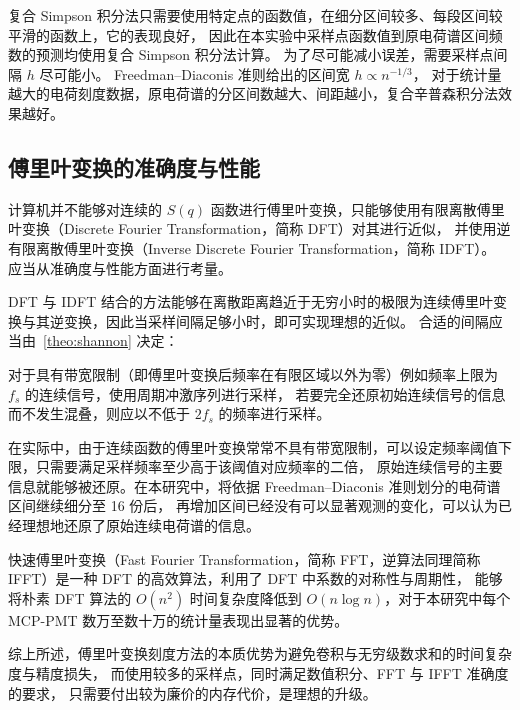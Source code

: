 复合 Simpson 积分法只需要使用特定点的函数值，在细分区间较多、每段区间较平滑的函数上，它的表现良好，
因此在本实验中采样点函数值到原电荷谱区间频数的预测均使用复合 Simpson 积分法计算。
为了尽可能减小误差，需要采样点间隔 $h$ 尽可能小。
Freedman–Diaconis 准则给出的区间宽 $h\propto n^{-1/3}$，
对于统计量越大的电荷刻度数据，原电荷谱的分区间数越大、间距越小，复合辛普森积分法效果越好。

\subsection{傅里叶变换的准确度与性能}

计算机并不能够对连续的 $S(q)$ 函数进行傅里叶变换，只能够使用有限离散傅里叶变换（Discrete Fourier Transformation，简称 DFT）对其进行近似，
并使用逆有限离散傅里叶变换（Inverse Discrete Fourier Transformation，简称 IDFT）。
应当从准确度与性能方面进行考量。

DFT 与 IDFT 结合的方法能够在离散距离趋近于无穷小时的极限为连续傅里叶变换与其逆变换，因此当采样间隔足够小时，即可实现理想的近似。
合适的间隔应当由~\ref{theo:shannon} 决定：
\begin{theorem}\label{theo:shannon}
    对于具有带宽限制（即傅里叶变换后频率在有限区域以外为零）例如频率上限为 $f_s$ 的连续信号，使用周期冲激序列进行采样，
    若要完全还原初始连续信号的信息而不发生混叠，则应以不低于 $2f_s$ 的频率进行采样。
\end{theorem}

在实际中，由于连续函数的傅里叶变换常常不具有带宽限制，可以设定频率阈值下限，只需要满足采样频率至少高于该阈值对应频率的二倍，
原始连续信号的主要信息就能够被还原。在本研究中，将依据 Freedman–Diaconis 准则划分的电荷谱区间继续细分至 16 份后，
再增加区间已经没有可以显著观测的变化，可以认为已经理想地还原了原始连续电荷谱的信息。

快速傅里叶变换（Fast Fourier Transformation，简称 FFT，逆算法同理简称 IFFT）是一种 DFT 的高效算法，利用了 DFT 中系数的对称性与周期性，
能够将朴素 DFT 算法的 $O(n^2)$ 时间复杂度降低到 $O(n\log{n})$，对于本研究中每个 MCP-PMT 数万至数十万的统计量表现出显著的优势。

综上所述，傅里叶变换刻度方法的本质优势为避免卷积与无穷级数求和的时间复杂度与精度损失，
而使用较多的采样点，同时满足数值积分、FFT 与 IFFT 准确度的要求，
只需要付出较为廉价的内存代价，是理想的升级。
